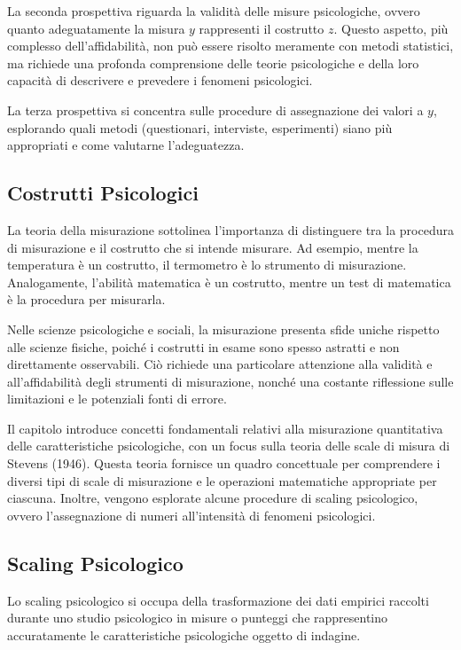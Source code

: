 \documentclass[
  letterpaper,
  krantz2]{{[}./krantz{]}}
\begin{document}
La seconda prospettiva riguarda la validità delle misure psicologiche,
ovvero quanto adeguatamente la misura \(y\) rappresenti il costrutto
\(z\). Questo aspetto, più complesso dell'affidabilità, non può essere
risolto meramente con metodi statistici, ma richiede una profonda
comprensione delle teorie psicologiche e della loro capacità di
descrivere e prevedere i fenomeni psicologici.

La terza prospettiva si concentra sulle procedure di assegnazione dei
valori a \(y\), esplorando quali metodi (questionari, interviste,
esperimenti) siano più appropriati e come valutarne l'adeguatezza.

\subsection{Costrutti Psicologici}\label{costrutti-psicologici}

La teoria della misurazione sottolinea l'importanza di distinguere tra
la procedura di misurazione e il costrutto che si intende misurare. Ad
esempio, mentre la temperatura è un costrutto, il termometro è lo
strumento di misurazione. Analogamente, l'abilità matematica è un
costrutto, mentre un test di matematica è la procedura per misurarla.

Nelle scienze psicologiche e sociali, la misurazione presenta sfide
uniche rispetto alle scienze fisiche, poiché i costrutti in esame sono
spesso astratti e non direttamente osservabili. Ciò richiede una
particolare attenzione alla validità e all'affidabilità degli strumenti
di misurazione, nonché una costante riflessione sulle limitazioni e le
potenziali fonti di errore.

Il capitolo introduce concetti fondamentali relativi alla misurazione
quantitativa delle caratteristiche psicologiche, con un focus sulla
teoria delle scale di misura di Stevens (1946). Questa teoria fornisce
un quadro concettuale per comprendere i diversi tipi di scale di
misurazione e le operazioni matematiche appropriate per ciascuna.
Inoltre, vengono esplorate alcune procedure di scaling psicologico,
ovvero l'assegnazione di numeri all'intensità di fenomeni psicologici.

\subsection{Scaling Psicologico}\label{scaling-psicologico}

Lo scaling psicologico si occupa della trasformazione dei dati empirici
raccolti durante uno studio psicologico in misure o punteggi che
rappresentino accuratamente le caratteristiche psicologiche oggetto di
indagine.
\end{document}
